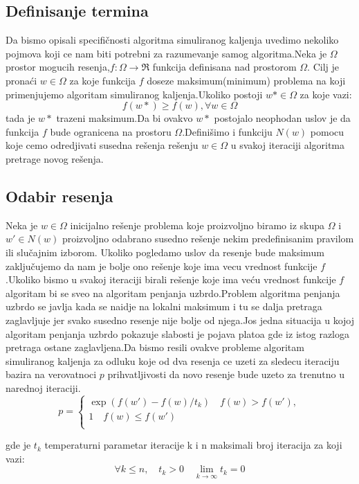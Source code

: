 \documentclass[a4paper]{article}
\begin{document}
\subsection{Definisanje termina}
Da bismo opisali specifičnosti algoritma simuliranog kaljenja uvedimo nekoliko pojmova koji ce nam biti potrebni za razumevanje samog algoritma.Neka je $\Omega$ prostor mogucih resenja,$f:\Omega \rightarrow \Re$ funkcija definisana nad prostorom $\Omega$. Cilj je pronaći  $w\in\Omega$ za koje funkcija $f$ doseze maksimum(minimum) problema na koji primenjujemo algoritam simuliranog kaljenja.Ukoliko postoji $w*\in\Omega$ za koje  vazi:$$f(w*)\geq f(w) , \forall w \in \Omega$$ tada je $w*$ trazeni maksimum.Da bi ovakvo $w*$ postojalo neophodan uslov je da funkcija $f$ bude ogranicena na prostoru $\Omega$.Definišimo i funkciju $N(w)$ pomocu koje cemo odredjivati susedna rešenja rešenju  $w\in\Omega$ u svakoj iteraciji algoritma pretrage novog rešenja. \par

\subsection{Odabir resenja}
Neka je $w\in\Omega$ inicijalno rešenje problema koje proizvoljno biramo iz skupa $\Omega$ i $w'\in N(w)$ proizvoljno odabrano susedno rešenje nekim predefinisanim pravilom ili slučajnim izborom. Ukoliko pogledamo uslov da resenje bude maksimum zaključujemo da nam je bolje ono rešenje koje ima vecu vrednost funkcije $f$.Ukoliko bismo u svakoj iteraciji birali rešenje koje ima veću vrednost funkcije $f$ algoritam bi se sveo na algoritam penjanja uzbrdo.Problem algoritma penjanja uzbrdo se javlja kada se naidje na lokalni maksimum i tu se dalja pretraga zaglavljuje jer svako susedno resenje nije bolje od njega.Jos jedna situacija u kojoj algoritam penjanja uzbrdo pokazuje slabosti je pojava platoa gde iz istog razloga pretraga ostane zaglavljena.Da bismo resili ovakve probleme algoritam simuliranog kaljenja za odluku koje od dva resenja ce uzeti za sledecu iteraciju bazira na verovatnoci $p$ prihvatljivosti da novo resenje bude uzeto za trenutno u narednoj iteraciji.
\[ p =
  \begin{cases}
    \exp(f(w')-f(w)/t_k)  \quad f(w) > f(w'),\\
    1  \quad f(w) \leq f(w')\\
  \end{cases}
\]


gde je $t_k$ temperaturni parametar iteracije k i n maksimali broj iteracija za koji vazi:
$$\forall k\leq n, \quad t_k > 0 \quad \lim_{k \to \infty}t_k=0 $$
\end{document}
